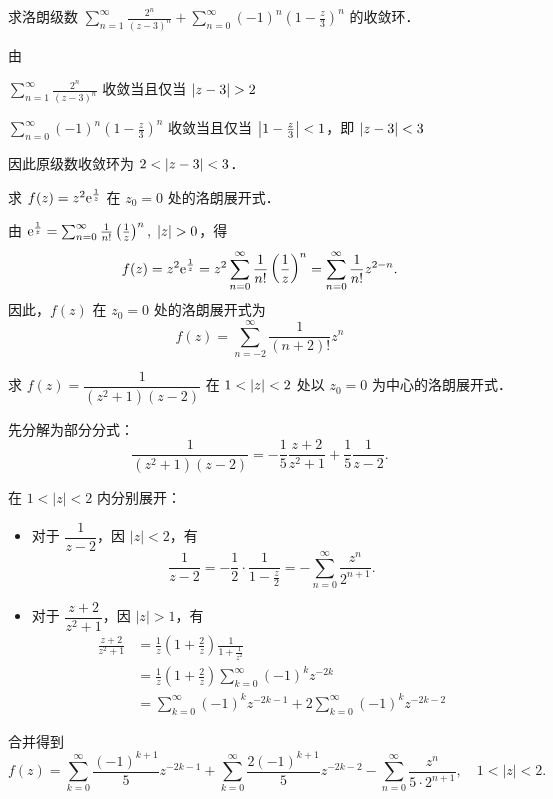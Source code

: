 \documentclass[12pt, a4paper, oneside, UTF8]{ctexbook}
\begin{document}
\begin{example}
    求洛朗级数 $\displaystyle\sum_{n=1}^{\infty}\frac{2^n}{(z-3)^n}+\sum_{n=0}^{\infty}(-1)^n\left(1-\frac{z}{3}\right)^n$ 的收敛环．
\end{example}
\begin{solution}
    由 
    
    $\displaystyle\sum_{n=1}^{\infty}\frac{2^n}{(z-3)^n}$ 收敛当且仅当 $\abs{z-3}>2$
    
    $\displaystyle\sum_{n=0}^{\infty}(-1)^n\left(1-\frac{z}{3}\right)^n$ 收敛当且仅当 $\abs{1-\frac{z}{3}}<1$，即 $\abs{z-3}<3$

    因此原级数收敛环为 $2<\abs{z-3}<3$．
\end{solution}
\begin{example}
    求 $f(z)=z^2\mathrm{e}^{\frac{1}{z}}$ 在 $z_0=0$ 处的洛朗展开式．
\end{example}
\begin{solution}
    由 $\mathrm{e}^{\frac{1}{z}} = \sum_{n=0}^{\infty}\frac{1}{n!}\left(\frac{1}{z}\right)^n,\;\abs{z}>0$，得
    \[
    f(z) = z^2\mathrm{e}^{\frac{1}{z}} = z^2\sum_{n=0}^{\infty}\frac{1}{n!}\left(\frac{1}{z}\right)^n = \sum_{n=0}^{\infty}\frac{1}{n!}z^{2-n}.
    \]
    因此，$f(z)$ 在 $z_0=0$ 处的洛朗展开式为
    \[
    f(z) = \sum_{n=-2}^{\infty} \frac{1}{(n+2)!}z^n
    \]
\end{solution}
\begin{example}
    求 $f(z)=\dfrac{1}{(z^2+1)(z-2)}$ 在 $1<\abs{z}<2$ 处以 $z_0=0$ 为中心的洛朗展开式．
\end{example}
\begin{solution}
先分解为部分分式：
\[
\frac{1}{(z^2+1)(z-2)}
= -\frac{1}{5}\frac{z+2}{z^2+1} + \frac{1}{5}\frac{1}{z-2}.
\]

在 \(1<|z|<2\) 内分别展开：

\begin{itemize}
    \item 对于 \(\dfrac{1}{z-2}\)，因 \(|z|<2\)，有
        \[
        \frac{1}{z-2} = -\frac{1}{2}\cdot \frac{1}{1-\frac{z}{2}}
        = -\sum_{n=0}^{\infty} \frac{z^n}{2^{n+1}}.
        \]
    \item 对于 \(\dfrac{z+2}{z^2+1}\)，因 \(|z|>1\)，有
        \begin{align*}
            \frac{z+2}{z^2+1}
            &= \frac{1}{z}\left(1+\frac{2}{z}\right)\frac{1}{1+\frac{1}{z^2}}\\
            &= \frac{1}{z}\left(1+\frac{2}{z}\right)\sum_{k=0}^{\infty}(-1)^k z^{-2k}\\
            &= \sum_{k=0}^{\infty} (-1)^k z^{-2k-1} + 2\sum_{k=0}^{\infty} (-1)^k z^{-2k-2}
        \end{align*}
\end{itemize}
    合并得到
    \[
    \boxed{
    f(z)=\sum_{k=0}^{\infty}\frac{(-1)^{k+1}}{5}z^{-2k-1}
    +\sum_{k=0}^{\infty}\frac{2(-1)^{k+1}}{5}z^{-2k-2}
    -\sum_{n=0}^{\infty}\frac{z^n}{5\cdot 2^{n+1}},\quad 1<|z|<2.
    }
    \]
\end{solution}
\end{document}
